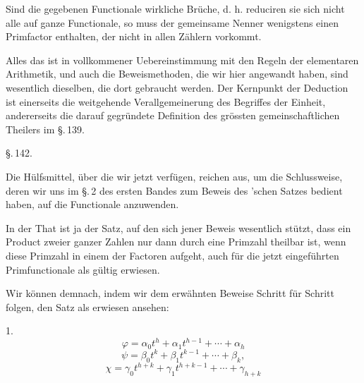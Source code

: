 Sind die gegebenen Functionale wirkliche Brüche, d. h. reduciren sie sich nicht alle auf ganze Functionale, so muss der gemeinsame Nenner wenigstens einen Primfactor enthalten, der nicht in allen Zählern vorkommt.

Alles das ist in vollkommener Uebereinstimmung mit den Regeln der elementaren Arithmetik, und auch die Beweismethoden, die wir hier angewandt haben, sind wesentlich dieselben, die dort gebraucht werden. Der Kernpunkt der Deduction ist einerseits die weitgehende Verallgemeinerung des Begriffes der Einheit, andererseits die darauf gegründete Definition des grössten gemeinschaftlichen Theilers im \S.\,139.

\begin{center}
\S.\,142.\\
\end{center}

Die Hülfsmittel, über die wir jetzt verfügen, reichen aus, um die Schlussweise, deren wir uns im \S.\,2 des ersten Bandes zum Beweis des 'schen Satzes bedient haben, auf die Functionale anzuwenden.

In der That ist ja der Satz, auf den sich jener Beweis wesentlich stützt, dass ein Product zweier ganzer Zahlen nur dann durch eine Primzahl theilbar ist, wenn diese Primzahl in einem der Factoren aufgeht, auch für die jetzt eingeführten Primfunctionale als gültig erwiesen.

Wir können demnach, indem wir dem erwähnten Beweise Schritt für Schritt folgen, den Satz als erwiesen ansehen:

1. 
\[
\varphi = \alpha_0 t^h + \alpha_1 t^{h-1} + \cdots + \alpha_h
\]
\[
\psi = \beta_0 t^k + \beta_1 t^{k-1} + \cdots + \beta_k,
\]
\[
\chi = \gamma_0 t^{h+k} + \gamma_1 t^{h+k-1} + \cdots + \gamma_{h+k}
\]
